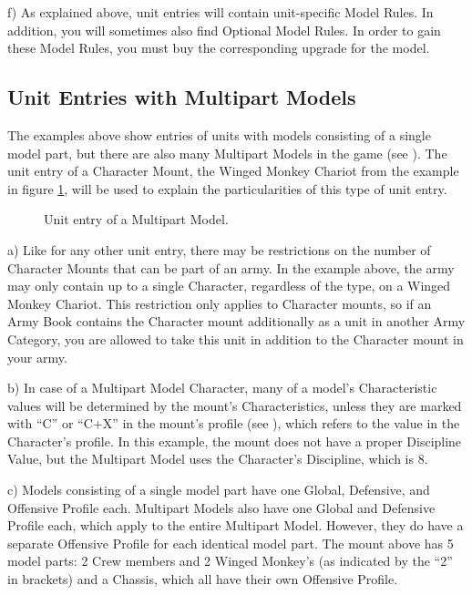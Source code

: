 f) As explained above, unit entries will contain unit-specific Model Rules. In addition, you will sometimes also find Optional Model Rules. In order to gain these Model Rules, you must buy the corresponding upgrade for the model.

\newpage
\subsection{Unit Entries with Multipart Models}

The examples above show entries of units with models consisting of a single model part, but there are also many Multipart Models in the game (see ). The unit entry of a Character Mount, the Winged Monkey Chariot from the example in figure \ref{figure/unit_entry_multipart_model}, will be used to explain the particularities of this type of unit entry.

\newcommand{\crew}{Crew}
\newcommand{\wingedmonkey}{Winged Monkey}
\newcommand{\chassis}{Chassis}

\begin{figure}[H]
	\centering
	
	\caption{Unit entry of a Multipart Model.}
	\label{figure/unit_entry_multipart_model}
\end{figure}

a) Like for any other unit entry, there may be restrictions on the number of Character Mounts that can be part of an army. In the example above, the army may only contain up to a single Character, regardless of the type, on a Winged Monkey Chariot. This restriction only applies to Character mounts, so if an Army Book contains the Character mount additionally as a unit in another Army Category, you are allowed to take this unit in addition to the Character mount in your army.

b) In case of a Multipart Model Character, many of a model's Characteristic values will be determined by the mount's Characteristics, unless they are marked with \enquote{C} or \enquote{C+X} in the mount's profile (see ), which refers to the value in the Character's profile. In this example, the mount does not have a proper Discipline Value, but the Multipart Model uses the Character's Discipline, which is 8.

c) Models consisting of a single model part have one Global, Defensive, and Offensive Profile each. Multipart Models also have one Global and Defensive Profile each, which apply to the entire Multipart Model. However, they do have a separate Offensive Profile for each identical model part. The mount above has 5 model parts: 2 Crew members and 2 Winged Monkey's (as indicated by the \enquote{2} in brackets) and a Chassis, which all have their own Offensive Profile.

